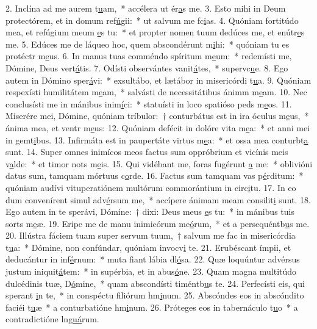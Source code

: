 2. Inclína ad me aurem t\uline{u}am,~* accélera ut ér\uline{a}s me.
3. Esto mihi in Deum protectórem, et in domum ref\uline{ú}gii:~* ut salvum me fc\uline{i}as.
4. Quóniam fortitúdo mea, et refúgium meum \uline{e}s tu:~* et propter nomen tuum dedúces me, et enútr\uline{e}s me.
5. Edúces me de láqueo hoc, quem abscondérunt m\uline{i}hi:~* quóniam tu es protéctr m\uline{e}us.
6. In manus tuas comméndo spíritum m\uline{e}um:~* redemísti me, Dómine, Deus vert\uline{á}tis.
7. Odísti observántes vanit\uline{á}tes,~* supervc\uline{u}e.
8. Ego autem in Dómino sper\uline{á}vi:~* exsultábo, et lætábor in misericórdi t\uline{u}a.
9. Quóniam respexísti humilitátem m\uline{e}am,~* salvásti de necessitátibus ánimm m\uline{e}am.
10. Nec conclusísti me in mánibus inim\uline{í}ci:~* statuísti in loco spatióso peds m\uline{e}os.
11. Miserére mei, Dómine, quóniam tríbulor:~† conturbátus est in ira óculus m\uline{e}us,~* ánima mea, et ventr m\uline{e}us:
12. Quóniam defécit in dolóre vita m\uline{e}a:~* et anni mei in gemt\uline{i}bus.
13. Infirmáta est in paupertáte virtus m\uline{e}a:~* et ossa mea conturbt\uline{a} sunt.
14. Super omnes inimícos meos factus sum oppróbrium et vicínis meis v\uline{a}lde:~* et timor nots m\uline{e}is.
15. Qui vidébant me, foras fugérunt \uline{a} me:~* oblivióni datus sum, tamquam mórtuus  c\uline{o}rde.
16. Factus sum tamquam vas p\uline{é}rditum:~* quóniam audívi vituperatiónem multórum commorántium in circ\uline{i}tu.
17. In eo dum convenírent simul adv\uline{é}rsum me,~* accípere ánimam meam consilit\uline{i} sunt.
18. Ego autem in te sperávi, Dómine:~† dixi: Deus meus \uline{e}s tu:~* in mánibus tuis sorts m\uline{e}æ.
19. Eripe me de manu inimicórum me\uline{ó}rum,~* et a persequéntb\uline{u}s me.
20. Illústra fáciem tuam super servum tuum,~† salvum me fac in misericórdia t\uline{u}a:~* Dómine, non confúndar, quóniam invocv\uline{i} te.
21. Erubéscant ímpii, et deducántur in inf\uline{é}rnum:~* muta fiant lábia dl\uline{ó}sa.
22. Quæ loquúntur advérsus justum iniquit\uline{á}tem:~* in supérbia, et in abus\uline{ó}ne.
23. Quam magna multitúdo dulcédinis tuæ, D\uline{ó}mine,~* quam abscondísti timéntb\uline{u}s te.
24. Perfecísti eis, qui sperant \uline{i}n te,~* in conspéctu filiórum hm\uline{i}num.
25. Abscóndes eos in abscóndito faciéi t\uline{u}æ~* a conturbatióne hm\uline{i}num.
26. Próteges eos in tabernáculo t\uline{u}o~* a contradictióne ln\uline{guá}rum.
